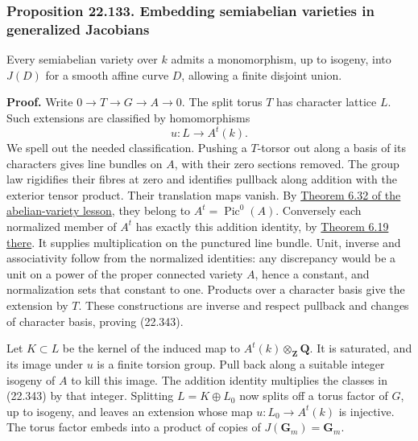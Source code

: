 \documentclass[
  11pt,
  a4paper,
]{article}
\begin{document}
\subsubsection{Proposition 22.133. Embedding semiabelian varieties in
generalized
Jacobians}\label{proposition-22.133.-embedding-semiabelian-varieties-in-generalized-jacobians}

Every semiabelian variety over \(k\) admits a monomorphism, up to
isogeny, into \(J(D)\) for a smooth affine curve \(D\), allowing a
finite disjoint union.

\textbf{Proof.} Write \(0\to T\to G\to A\to0\). The split torus \(T\)
has character lattice \(L\). Such extensions are classified by
homomorphisms \[
 u:L\longrightarrow A^t(k).
 \tag{22.343}
\] We spell out the needed classification. Pushing a \(T\)-torsor out
along a basis of its characters gives line bundles on \(A\), with their
zero sections removed. The group law rigidifies their fibres at zero and
identifies pullback along addition with the exterior tensor product.
Their translation maps vanish. By
\href{https://github.com/KokunoYumeto/open-math-courses-public/blob/146dc81802e69cf262fb6cc65c1b9f74e71f4625/docs/courses/AG-GS/src/abelian-varieties.md\#biduality-isogeny-kernels-and-the-picard-component-group}{Theorem
6.32 of the abelian-variety lesson}, they belong to
\(A^t=\operatorname{Pic}^0(A)\). Conversely each normalized member of
\(A^t\) has exactly this addition identity, by
\href{https://github.com/KokunoYumeto/open-math-courses-public/blob/146dc81802e69cf262fb6cc65c1b9f74e71f4625/docs/courses/AG-GS/src/abelian-varieties.md\#the-representing-dual-and-its-universal-bundle}{Theorem
6.19 there}. It supplies multiplication on the punctured line bundle.
Unit, inverse and associativity follow from the normalized identities:
any discrepancy would be a unit on a power of the proper connected
variety \(A\), hence a constant, and normalization sets that constant to
one. Products over a character basis give the extension by \(T\). These
constructions are inverse and respect pullback and changes of character
basis, proving (22.343).

Let \(K\subset L\) be the kernel of the induced map to
\(A^t(k)\otimes_{\mathbf Z}\mathbf Q\). It is saturated, and its image
under \(u\) is a finite torsion group. Pull back along a suitable
integer isogeny of \(A\) to kill this image. The addition identity
multiplies the classes in (22.343) by that integer. Splitting
\(L=K\oplus L_0\) now splits off a torus factor of \(G\), up to isogeny,
and leaves an extension whose map \(u:L_0\to A^t(k)\) is injective. The
torus factor embeds into a product of copies of
\(J(\mathbf G_m)=\mathbf G_m\).
\end{document}
